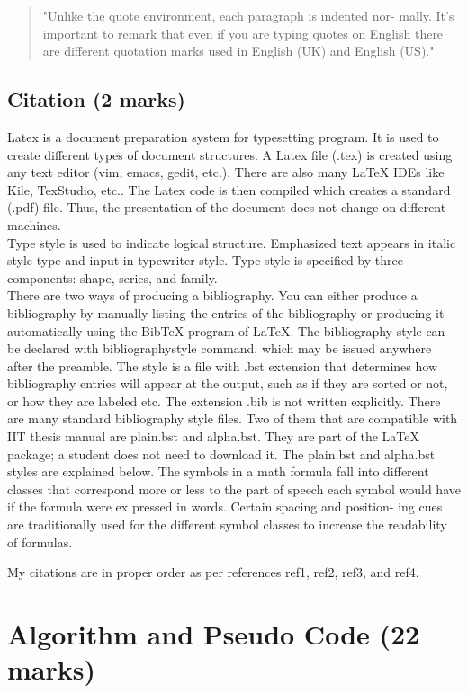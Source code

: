 \documentclass[a4paper, 11pt]{article}
\begin{document}
\begin{quote}
"Unlike the quote environment, each paragraph is indented nor- mally.
It’s important to remark that even if you are typing quotes on English
there are different quotation marks used in English (UK) and English
(US)."
\end{quote}

\subsection{Citation (2 marks)}
Latex \cite{first} is a document preparation system for typesetting program. It is used
to create different types of document structures. A Latex file (.tex) is created
using any text editor (vim, emacs, gedit, etc.). There are also many LaTeX
IDEs like Kile, TexStudio, etc.. The Latex code is then compiled which creates
a standard (.pdf) file. Thus, the presentation of the document does not change
on different machines.
\\
Type style\cite{second} is used to indicate logical structure. Emphasized text appears in
italic style type and input in typewriter style. Type style is specified by three
components: shape, series, and family.\\

There are two ways of producing a bibliography\cite{third}. You can either produce
a bibliography by manually listing the entries of the bibliography or producing
it automatically using the BibTeX program of LaTeX. The bibliography style can
be declared with bibliographystyle command, which may be issued anywhere
after the preamble. The style is a file with .bst extension that determines how
bibliography entries will appear at the output, such as if they are sorted or not,
or how they are labeled etc. The extension .bib is not written explicitly. There
are many standard bibliography style files. Two of them that are compatible
with IIT thesis manual are plain.bst and alpha.bst. They are part of the LaTeX
package; a student does not need to download it. The plain.bst and alpha.bst
styles are explained below. The symbols in a math formula fall into different
classes that correspond more or less to the part of speech each symbol would
have if the formula were ex pressed in words. Certain spacing and position-
ing cues are traditionally used for the different symbol classes to increase the
readability of formulas. \cite{fourth}

My citations are in proper order as per references ref1, ref2, ref3, and ref4.
\newpage
\section{Algorithm and Pseudo Code (22 marks)}
\end{document}
